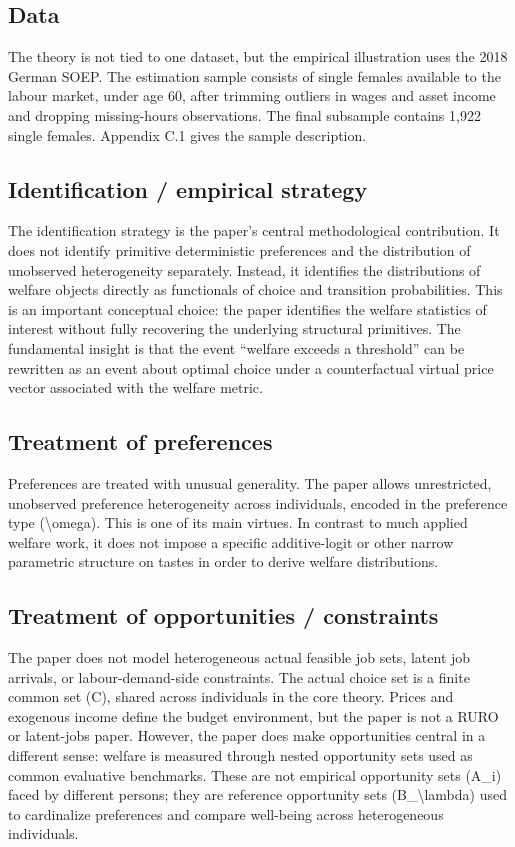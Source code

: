 \documentclass[11pt,a4paper]{article}
\begin{document}
\subsection*{Data}
The theory is not tied to one dataset, but the empirical illustration uses the 2018 German SOEP. The estimation sample consists of single females available to the labour market, under age 60, after trimming outliers in wages and asset income and dropping missing-hours observations. The final subsample contains 1,922 single females. Appendix C.1 gives the sample description.

\subsection*{Identification / empirical strategy}
The identification strategy is the paper’s central methodological contribution. It does not identify primitive deterministic preferences and the distribution of unobserved heterogeneity separately. Instead, it identifies the distributions of welfare objects directly as functionals of choice and transition probabilities. This is an important conceptual choice: the paper identifies the welfare statistics of interest without fully recovering the underlying structural primitives. The fundamental insight is that the event “welfare exceeds a threshold” can be rewritten as an event about optimal choice under a counterfactual virtual price vector associated with the welfare metric.

\subsection*{Treatment of preferences}
Preferences are treated with unusual generality. The paper allows unrestricted, unobserved preference heterogeneity across individuals, encoded in the preference type (\textbackslash{}omega). This is one of its main virtues. In contrast to much applied welfare work, it does not impose a specific additive-logit or other narrow parametric structure on tastes in order to derive welfare distributions.

\subsection*{Treatment of opportunities / constraints}
The paper does not model heterogeneous actual feasible job sets, latent job arrivals, or labour-demand-side constraints. The actual choice set is a finite common set (C), shared across individuals in the core theory. Prices and exogenous income define the budget environment, but the paper is not a RURO or latent-jobs paper. However, the paper does make opportunities central in a different sense: welfare is measured through nested opportunity sets used as common evaluative benchmarks. These are not empirical opportunity sets (A\_i) faced by different persons; they are reference opportunity sets (B\_\textbackslash{}lambda) used to cardinalize preferences and compare well-being across heterogeneous individuals.
\end{document}
